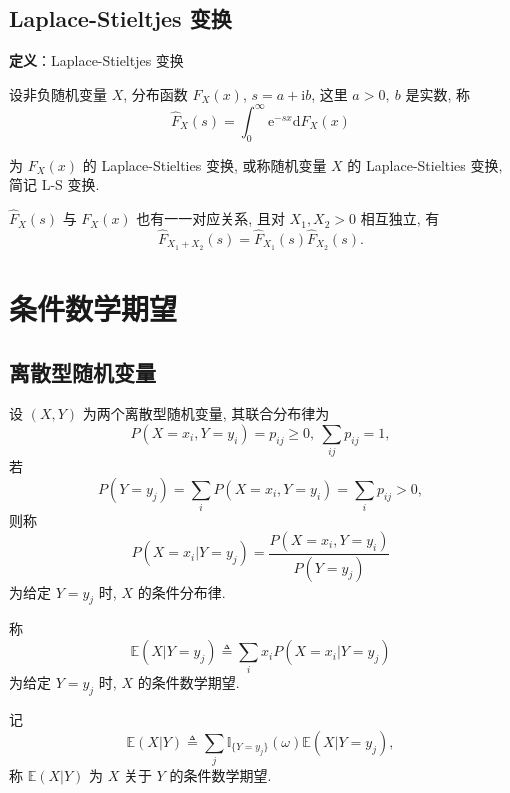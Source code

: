 \documentclass[openany]{ctexbook}
\theoremstyle{kaiti}
\theoremstyle{normal}
\begin{document}
\subsection{Laplace-Stieltjes 变换}

\textbf{定义}：Laplace-Stieltjes 变换

设非负随机变量 $X$, 分布函数 $F_X(x)$, $s=a+\mathrm{i}b$, 这里 $a>0,~b$ 是实数, 称
\begin{equation}
  \hat{F}_X(s)=\int_0^\infty\mathrm{e}^{-sx}\mathrm{d}F_X(x)
\end{equation}

为 $F_X(x)$ 的 Laplace-Stielties 变换, 或称随机变量 $X$ 的 Laplace-Stielties 变换, 简记 L-S 变换. 

$\hat{F}_X(s)$ 与 $F_X(x)$ 也有一一对应关系, 且对 $X_1,X_2>0$ 相互独立, 有
\begin{equation}
  \hat{F}_{X_1+X_2}(s)=\hat{F}_{X_1}(s)\hat{F}_{X_2}(s).
\end{equation}

\section{条件数学期望}

\subsection{离散型随机变量}

设 $(X,Y)$ 为两个离散型随机变量, 其联合分布律为
\begin{equation}
  P(X=x_i,Y=y_i)=p_{ij}\geqslant0,~\sum_{ij}p_{ij}=1,
\end{equation}
 若
\begin{equation}
  P(Y=y_j)=\sum_iP(X=x_i,Y=y_i)=\sum_ip_{ij}>0,
\end{equation}
 则称
\begin{equation}
  P(X=x_i|Y=y_j)=\frac{P(X=x_i,Y=y_i)}{P(Y=y_j)}
\end{equation}
 为给定 $Y=y_j$ 时, $X$ 的条件分布律.

称
\begin{equation}
  \mathbb{E}(X|Y=y_j)\triangleq\sum_ix_iP(X=x_i|Y=y_j)
\end{equation}
 为给定 $Y=y_j$ 时, $X$ 的条件数学期望.

记
\begin{equation}
  \mathbb{E}(X|Y)\triangleq\sum_j\mathbb{I}_{\{Y=y_j\}}(\omega)\mathbb{E}(X|Y=y_j),
\end{equation}
 称 $\mathbb{E}(X|Y)$ 为 $X$ 关于 $Y$ 的条件数学期望. 
\end{document}
